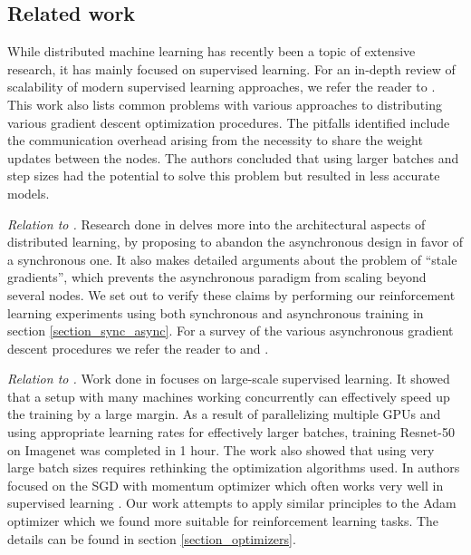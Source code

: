 \documentclass{llncs}
\begin{document}
\subsection{Related work}

While distributed machine learning has recently been a topic of extensive research, it has mainly focused on supervised learning. For an in-depth review of scalability of modern supervised learning approaches, we refer the reader to \cite{MLHPC_scalability_limits}. This work also lists common problems with various approaches to distributing various gradient descent optimization procedures. The pitfalls identified include the communication overhead arising from the necessity to share the weight updates between the nodes. The authors concluded that using larger batches and step sizes had the potential to solve this problem but resulted in less accurate models. 

\textit{Relation to \cite{google_brain_paper}.}
Research done in \cite{google_brain_paper} delves more into the architectural aspects of distributed learning, by proposing to abandon the asynchronous design in favor of a synchronous one. It also makes detailed arguments about the problem of ``stale gradients'', which prevents the asynchronous paradigm from scaling beyond several nodes. We set out to verify these claims by performing our reinforcement learning experiments using both synchronous and asynchronous training in section \ref{section_sync_async}. For a survey of the various asynchronous gradient descent procedures we refer the reader to \cite{MLHPC_asynchronous_sgd} and \cite{MLHPC_asynchronous_core}.

\textit{Relation to \cite{fair_paper}.} 
Work done in \cite{fair_paper} focuses on large-scale supervised learning. It showed that a setup with many machines working concurrently can effectively speed up the training by a large margin. As a result of parallelizing multiple GPUs and using appropriate learning rates for effectively larger batches, training Resnet-50 on Imagenet was completed in 1 hour. The work \cite{fair_paper} also showed that using very large batch sizes requires rethinking the optimization algorithms used. In \cite{fair_paper} authors focused on the SGD with momentum optimizer which often works very well in supervised learning  \cite{sutskever_momentum}. Our work attempts to apply similar principles to the Adam optimizer which we found more suitable for reinforcement learning tasks. The details can be found in section \ref{section_optimizers}.
\end{document}
